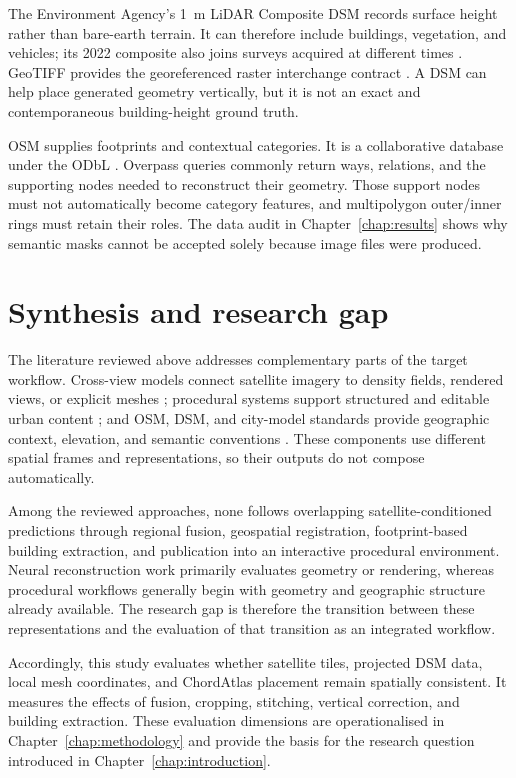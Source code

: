 The Environment Agency's \SI{1}{\metre} LiDAR Composite DSM records surface
height rather than bare-earth terrain.  It can therefore include buildings,
vegetation, and vehicles; its 2022 composite also joins surveys acquired at
different times \cite{environmentAgencyDSM2022}.  GeoTIFF provides the
georeferenced raster interchange contract \cite{ogc2019geotiff}.  A DSM can
help place generated geometry vertically, but it is not an exact and
contemporaneous building-height ground truth.

OSM supplies footprints and contextual categories.  It is a collaborative
database under the ODbL \cite{openstreetmapData}.  Overpass queries commonly
return ways, relations, and the supporting nodes needed to reconstruct their
geometry.  Those support nodes must not automatically become category features,
and multipolygon outer/inner rings must retain their roles.  The data audit in
Chapter~\ref{chap:results} shows why semantic masks cannot be accepted solely
because image files were produced.

\section{Synthesis and research gap}

The literature reviewed above addresses complementary parts of the target
workflow.  Cross-view models connect satellite imagery to density fields,
rendered views, or explicit meshes
\cite{qian2023sat2density,qian2026sat3dgen}; procedural systems support
structured and editable urban content
\cite{kelly2017bigsur,kellyChordAtlas2024,esriCityEngineIntro2026}; and OSM,
DSM, and city-model standards provide geographic context, elevation, and
semantic conventions
\cite{openstreetmapData,environmentAgencyDSM2022,ogcCityGML3}.  These
components use different spatial frames and representations, so their outputs
do not compose automatically.

Among the reviewed approaches, none follows overlapping
satellite-conditioned predictions through regional fusion, geospatial
registration, footprint-based building extraction, and publication into an
interactive procedural environment.  Neural reconstruction work primarily
evaluates geometry or rendering, whereas procedural workflows generally begin
with geometry and geographic structure already available.  The research gap
is therefore the transition between these representations and the evaluation
of that transition as an integrated workflow.

Accordingly, this study evaluates whether satellite tiles, projected DSM data,
local mesh coordinates, and ChordAtlas placement remain spatially consistent.
It measures the effects of fusion, cropping, stitching, vertical correction,
and building extraction.  These evaluation
dimensions are operationalised in Chapter~\ref{chap:methodology} and provide
the basis for the research question introduced in
Chapter~\ref{chap:introduction}.
